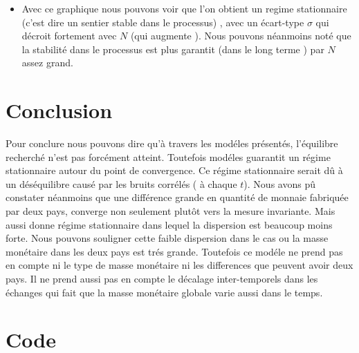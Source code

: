 \documentclass[11pt,]{article}
\providecommand{\tightlist}{%
  \setlength{\itemsep}{0pt}\setlength{\parskip}{0pt}}
\begin{document}
\begin{itemize}
\tightlist
\item
  Avec ce graphique nous pouvons voir que l'on obtient un regime
  stationnaire (c'est dire un sentier stable dans le processus) , avec
  un écart-type \(\sigma\) qui décroit fortement avec \(N\) (qui
  augmente ). Nous pouvons néanmoins noté que la stabilité dans le
  processus est plus garantit (dans le long terme ) par \(N\) assez
  grand.
\end{itemize}

\section{Conclusion}\label{conclusion}

Pour conclure nous pouvons dire qu'à travers les modéles présentés,
l'équilibre recherché n'est pas forcément atteint. Toutefois modéles
guarantit un régime stationnaire autour du point de convergence. Ce
régime stationnaire serait dû à un déséquilibre causé par les bruits
corrélés ( à chaque \(t\)). Nous avons pû constater néanmoins que une
différence grande en quantité de monnaie fabriquée par deux pays,
converge non seulement plutôt vers la mesure invariante. Mais aussi
donne régime stationnaire dans lequel la dispersion est beaucoup moins
forte. Nous pouvons souligner cette faible dispersion dans le cas ou la
masse monétaire dans les deux pays est trés grande. Toutefois ce modéle
ne prend pas en compte ni le type de masse monétaire ni les differences
que peuvent avoir deux pays. Il ne prend aussi pas en compte le décalage
inter-temporels dans les échanges qui fait que la masse monétaire
globale varie aussi dans le temps.

\section{Code}\label{code}
\end{document}
